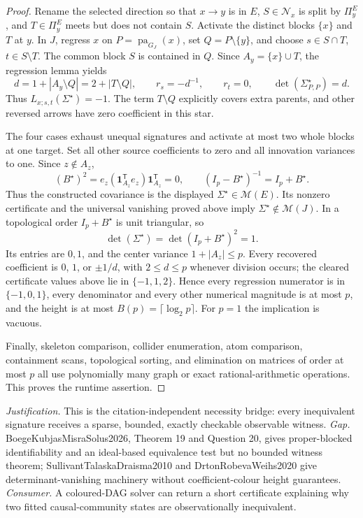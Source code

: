 \documentclass{article}
\begin{document}
\begin{proof}
Rename the selected direction so that \(x\to y\) is in \(E\), \(S\in\mathcal N_x\) is split by \(\Pi^E_y\), and \(T\in\Pi^E_y\) meets but does not contain \(S\).  Activate the distinct blocks \(\{x\}\) and \(T\) at \(y\).  In \(J\), regress \(x\) on \(P=\operatorname{pa}_{G_J}(x)\), set \(Q=P\setminus\{y\}\), and choose \(s\in S\cap T\), \(t\in S\setminus T\).  The common block \(S\) is contained in \(Q\).  Since \(A_y=\{x\}\cup T\), the regression lemma yields
\[
 d=1+|A_y\setminus Q|=2+|T\setminus Q|,\qquad
 r_s=-d^{-1},\qquad r_t=0,\qquad
 \det(\Sigma^{\star}_{P,P})=d.
\]
Thus \(L_{x;s,t}(\Sigma^{\star})=-1\).  The term \(T\setminus Q\) explicitly covers extra parents, and other reversed arrows have zero coefficient in this star.

The four cases exhaust unequal signatures and activate at most two whole blocks at one target.  Set all other source coefficients to zero and all innovation variances to one.  Since \(z\notin A_z\),
\[
 (B^{\star})^2=e_z(\mathbf 1_{A_z}^{\mathsf T}e_z)\mathbf 1_{A_z}^{\mathsf T}=0,
 \qquad (I_p-B^{\star})^{-1}=I_p+B^{\star}.
\]
Thus the constructed covariance is the displayed \(\Sigma^{\star}\in\mathcal M(E)\).  Its nonzero certificate and the universal vanishing proved above imply \(\Sigma^{\star}\notin\mathcal M(J)\).  In a topological order \(I_p+B^{\star}\) is unit triangular, so
\[
 \det(\Sigma^{\star})=\det(I_p+B^{\star})^2=1.
\]
Its entries are \(0,1\), and the center variance \(1+|A_z|\le p\).  Every recovered coefficient is \(0\), \(1\), or \(\pm1/d\), with \(2\le d\le p\) whenever division occurs; the cleared certificate values above lie in \(\{-1,1,2\}\).  Hence every regression numerator is in \(\{-1,0,1\}\), every denominator and every other numerical magnitude is at most \(p\), and the height is at most \(B(p)=\lceil\log_2p\rceil\).  For \(p=1\) the implication is vacuous.

Finally, skeleton comparison, collider enumeration, atom comparison, containment scans, topological sorting, and elimination on matrices of order at most \(p\) all use polynomially many graph or exact rational-arithmetic operations.  This proves the runtime assertion.
\end{proof}
\par\smallskip\noindent \textit{Justification.} This is the citation-independent necessity bridge: every inequivalent signature receives a sparse, bounded, exactly checkable observable witness. \textit{Gap.} BoegeKubjasMisraSolus2026, Theorem 19 and Question 20, gives proper-blocked identifiability and an ideal-based equivalence test but no bounded witness theorem; SullivantTalaskaDraisma2010 and DrtonRobevaWeihs2020 give determinant-vanishing machinery without coefficient-colour height guarantees. \textit{Consumer.} A coloured-DAG solver can return a short certificate explaining why two fitted causal-community states are observationally inequivalent.
\end{document}
